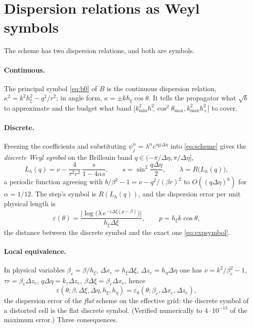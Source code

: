 \documentclass[11pt]{article}
\newcommand{\het}{\nu}
\begin{document}
\section{Dispersion relations as Weyl symbols}\label{sec:dispersion}

The scheme has two dispersion relations, and both are symbols.

\paragraph{Continuous.} The principal symbol \eqref{eq:b0} of $B$ is the
continuous dispersion relation, $\kappa^2=k^2h_\xi^2-q^2/r^2$; in angle form,
$\kappa=\pm kh_\xi\cos\theta$. It tells the propagator what $\sqrt b$ to
approximate and the budget what band $\bigl[k_{\min}^2h_-^2\cos^2\theta_{\max},
k_{\max}^2h_+^2\bigr]$ to cover.

\paragraph{Discrete.} Freezing the coefficients and substituting
$\psi^n_j=\lambda^ne^{iqj\Delta\eta}$ into \eqref{eq:scheme} gives the
\emph{discrete Weyl symbol} on the Brillouin band
$q\in(-\pi/\Delta\eta,\pi/\Delta\eta]$,
\begin{equation}\label{eq:Lh}
L_h(q)=\het-\frac4{\tau^2r^2}\,\frac{s}{1-4\alpha s},\qquad
s=\sin^2\frac{q\Delta\eta}2,\qquad
\lambda=R\bigl(L_h(q)\bigr),
\end{equation}
a periodic function agreeing with $b/\beta^2-1=\het-q^2/(\beta r)^2$ to
$O((q\Delta\eta)^6)$ for $\alpha=1/12$. The step's symbol is $R(L_h(q))$, and
the dispersion error per unit physical length is
\begin{equation}\label{eq:disp}
\varepsilon(\theta)=\frac{\bigl|\log\bigl(\lambda\,e^{-i\Delta\xi(p-\beta)}\bigr)\bigr|}
{h_\xi\Delta\xi},\qquad p=h_\xi k\cos\theta ,
\end{equation}
the distance between the discrete symbol and the exact one \eqref{eq:expsymbol}.

\paragraph{Local equivalence.} In physical variables
$\beta_e=\beta/h_\xi$, $\Delta x_e=h_\xi\Delta\xi$, $\Delta z_e=h_\eta\Delta\eta$
one has $\het=k^2/\beta_e^2-1$, $\tau r=\beta_e\Delta z_e$,
$q\Delta\eta=k_z\Delta z_e$, $\beta\Delta\xi=\beta_e\Delta x_e$, hence
\begin{equation}\label{eq:equiv}
\varepsilon(\theta;\beta,\Delta\xi,\Delta\eta,h_\xi,h_\eta)
=\varepsilon_0(\theta;\beta_e,\Delta x_e,\Delta z_e),
\end{equation}
the dispersion error of the \emph{flat} scheme on the effective grid: the
discrete symbol of a distorted cell is the flat discrete symbol. (Verified
numerically to $4\cdot10^{-13}$ of the maximum error.) Three consequences.
\end{document}
